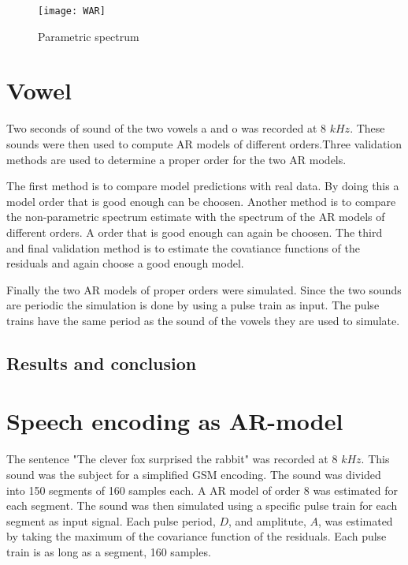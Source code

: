\documentclass[10pt]{article}
\begin{document}
\begin{figure}[!hp]

    \begin{center}
      \texttt{[image: WAR]}
    \caption{Parametric spectrum \label{fig:WAR}}
    \end{center}

\end{figure}


\section{Vowel}
Two seconds of sound of the two vowels a and o was recorded at
8 $kHz$. These sounds were then used to compute AR models of
different orders.Three validation methods are used to determine
a proper order for the two AR models.

The first method is to compare model predictions with real data.
By doing this a model order that is good enough can be choosen.
Another method is to compare the non-parametric spectrum estimate
with the spectrum of the AR models of different orders. A order
that is good enough can again be choosen. The third and final
validation method is to estimate the covatiance functions of the
residuals and again choose a good enough model.

Finally the two AR models of proper orders were simulated. Since
the two sounds are periodic the simulation is done by using a
pulse train as input. The pulse trains have the same period as the
sound of the vowels they are used to simulate.

\subsection{Results and conclusion}

\section{Speech encoding as AR-model}
The sentence "The clever fox surprised the rabbit" was recorded at
8 $kHz$. This sound was the subject for a simplified GSM encoding.
The sound was divided into 150 segments of 160 samples each. A
AR model of order 8 was estimated for each segment. The sound was
then simulated using a specific pulse train for each segment as
input signal. Each pulse period, $D$, and amplitute, $A$, was
estimated by taking the maximum of the covariance function of the
residuals. Each pulse train is as long as a segment, 160 samples.
\end{document}
